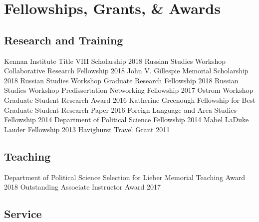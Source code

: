 \documentclass[11pt,]{article}
\begin{document}
\vspace{-1mm}

\hypertarget{fellowships-grants-awards}{%
\section{Fellowships, Grants, \&
Awards}\label{fellowships-grants-awards}}

\vspace{-2mm}

\hypertarget{research-and-training}{%
\subsection{Research and Training}\label{research-and-training}}

\vspace{-2mm}

Kennan Institute Title VIII Scholarship \hfill 2018 \break Russian
Studies Workshop Collaborative Research Fellowship \hfill 2018 \break
John V. Gillespie Memorial Scholarship \hfill 2018 \break Russian
Studies Workshop Graduate Research Fellowship \hfill 2018 \break Russian
Studies Workshop Predissertation Networking Fellowship \hfill 2017
\break Ostrom Workshop Graduate Student Research Award \hfill 2016
\break Katherine Greenough Fellowship for Best Graduate Student Research
Paper \hfill 2016 \break Foreign Language and Area Studies Fellowship
\hfill 2014 \break Department of Political Science Fellowship
\hfill 2014 \break Mabel LaDuke Lauder Fellowship \hfill 2013 \break
Havighurst Travel Grant \hfill 2011 \break

\vspace{-7mm}

\hypertarget{teaching}{%
\subsection{Teaching}\label{teaching}}

\vspace{-2mm}

Department of Political Science Selection for Lieber Memorial Teaching
Award \hfill 2018 \break Outstanding Associate Instructor Award
\hfill 2017 \break

\vspace{-7mm}

\hypertarget{service}{%
\subsection{Service}\label{service}}
\end{document}

